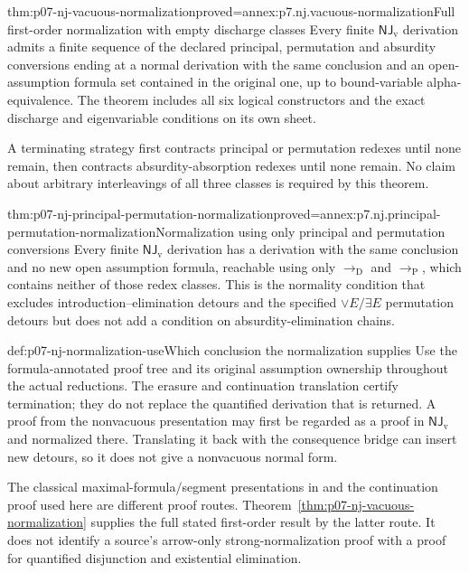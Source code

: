 \begin{hbtheorem}{thm:p07-nj-vacuous-normalization}{proved=annex:p7.nj.vacuous-normalization}{Full first-order normalization with empty discharge classes}
Every finite \(\mathsf{NJ}_{\mathrm v}\) derivation admits a
finite sequence of the declared principal, permutation and
absurdity conversions ending at a normal derivation with the
same conclusion and an open-assumption formula set contained
in the original one, up to bound-variable alpha-equivalence.
The theorem includes all six logical constructors and the
exact discharge and eigenvariable conditions on its own sheet.

A terminating strategy first contracts principal or permutation
redexes until none remain, then contracts absurdity-absorption
redexes until none remain. No claim about arbitrary interleavings
of all three classes is required by this theorem.
\end{hbtheorem}

\begin{hbcorollary}{thm:p07-nj-principal-permutation-normalization}{proved=annex:p7.nj.principal-permutation-normalization}{Normalization using only principal and permutation conversions}
Every finite \(\mathsf{NJ}_{\mathrm v}\) derivation has a
derivation with the same conclusion and no new open assumption
formula, reachable using only \(\to_{\mathrm D}\) and
\(\to_{\mathrm P}\), which contains neither of those redex
classes. This is the normality condition that excludes
introduction--elimination detours and the specified
\(\lor E/\exists E\) permutation detours but does not
add a condition on absurdity-elimination chains.
\end{hbcorollary}

\begin{hbmethod}{def:p07-nj-normalization-use}{Which conclusion the normalization supplies}
Use the formula-annotated proof tree and its original assumption
ownership throughout the actual reductions. The erasure and
continuation translation certify termination; they do not
replace the quantified derivation that is returned. A proof
from the nonvacuous presentation may first be regarded as a
proof in \(\mathsf{NJ}_{\mathrm v}\) and normalized there.
Translating it back with the consequence bridge can insert
new detours, so it does not give a nonvacuous normal form.

The classical maximal-formula/segment presentations in
\cite{Prawitz1965,TroelstraSchwichtenberg2000} and the
continuation proof used here are different proof routes.
Theorem~\ref{thm:p07-nj-vacuous-normalization} supplies the
full stated first-order result by the latter route. It does
not identify a source's arrow-only strong-normalization proof
with a proof for quantified disjunction and existential elimination.
\end{hbmethod}
